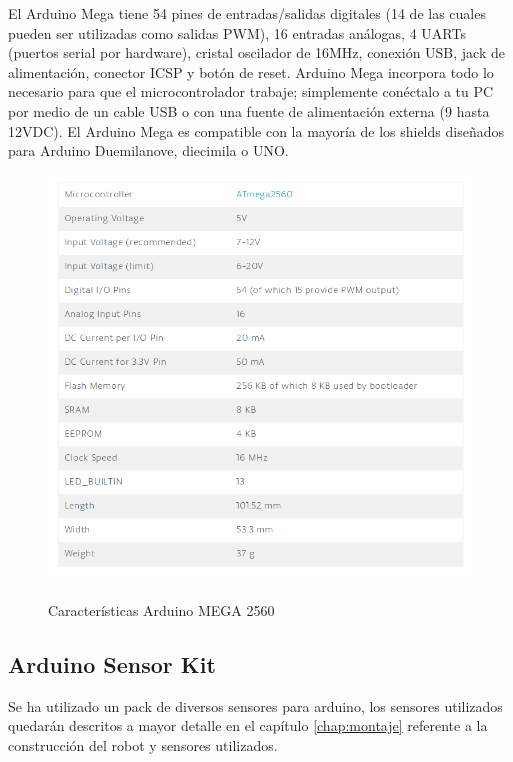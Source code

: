 El Arduino Mega tiene 54 pines de entradas/salidas digitales (14 de las cuales pueden ser utilizadas como salidas PWM), 16 entradas análogas, 4 UARTs (puertos serial por
hardware), cristal oscilador de 16MHz, conexión USB, jack de alimentación, conector ICSP y botón de reset.  Arduino Mega incorpora todo lo necesario para que el microcontrolador
trabaje; simplemente conéctalo a tu PC por medio de un cable USB o con una fuente de alimentación externa (9 hasta 12VDC). El Arduino Mega es compatible con la mayoría de los 
shields diseñados para Arduino Duemilanove, diecimila o UNO.

\begin{figure}[H]
  \begin{center}
    \includegraphics[scale=0.5]{imagenes/arduino_caracteristicas.png}\\
    \caption{Características Arduino MEGA 2560}
  \end{center}
\end{figure}


\subsection {Arduino Sensor Kit}

Se ha utilizado un pack de diversos sensores para arduino, los sensores utilizados quedarán descritos a mayor detalle en el capítulo \ref{chap:montaje} referente a la construcción del robot y sensores utilizados.\\

